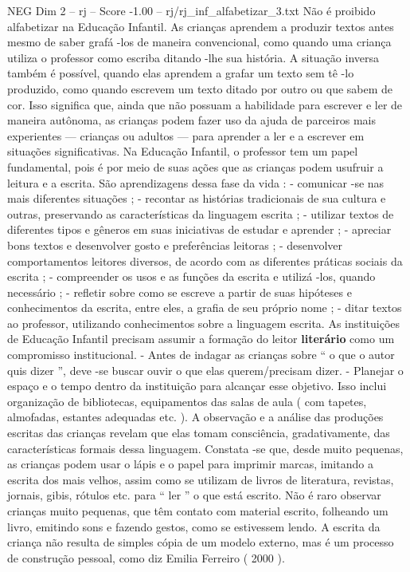 \begin{textsample}{NEG Dim 2 – rj – Score -1.00 – rj/rj\_inf\_alfabetizar\_3.txt}
Não é proibido alfabetizar na Educação Infantil.
As crianças aprendem a produzir textos antes mesmo de saber grafá -los de maneira convencional, como quando uma criança utiliza o professor como escriba ditando -lhe sua história.
A situação inversa também é possível, quando elas aprendem a grafar um texto sem tê -lo produzido, como quando escrevem um texto ditado por outro ou que sabem de cor.
Isso significa que, ainda que não possuam a habilidade para escrever e ler de maneira autônoma, as crianças podem fazer uso da ajuda de parceiros mais experientes — crianças ou adultos — para aprender a ler e a escrever em situações significativas.
Na Educação Infantil, o professor tem um papel fundamental, pois é por meio de suas ações que as crianças podem usufruir a leitura e a escrita.
São aprendizagens dessa fase da vida : - comunicar -se nas mais diferentes situações ; - recontar as histórias tradicionais de sua cultura e outras, preservando as características da linguagem escrita ; - utilizar textos de diferentes tipos e gêneros em suas iniciativas de estudar e aprender ; - apreciar bons textos e desenvolver gosto e preferências leitoras ; - desenvolver comportamentos leitores diversos, de acordo com as diferentes práticas sociais da escrita ; - compreender os usos e as funções da escrita e utilizá -los, quando necessário ; - refletir sobre como se escreve a partir de suas hipóteses e conhecimentos da escrita, entre eles, a grafia de seu próprio nome ; - ditar textos ao professor, utilizando conhecimentos sobre a linguagem escrita.
As instituições de Educação Infantil precisam assumir a formação do leitor \textbf{literário} como um compromisso institucional. - Antes de indagar as crianças sobre “ o que o autor quis dizer ”, deve -se buscar ouvir o que elas querem/precisam dizer. - Planejar o espaço e o tempo dentro da instituição para alcançar esse objetivo.
Isso inclui organização de bibliotecas, equipamentos das salas de aula ( com tapetes, almofadas, estantes adequadas etc. ).
A observação e a análise das produções escritas das crianças revelam que elas tomam consciência, gradativamente, das características formais dessa linguagem.
Constata -se que, desde muito pequenas, as crianças podem usar o lápis e o papel para imprimir marcas, imitando a escrita dos mais velhos, assim como se utilizam de livros de literatura, revistas, jornais, gibis, rótulos etc. para “ ler ” o que está escrito.
Não é raro observar crianças muito pequenas, que têm contato com material escrito, folheando um livro, emitindo sons e fazendo gestos, como se estivessem lendo.
A escrita da criança não resulta de simples cópia de um modelo externo, mas é um processo de construção pessoal, como diz Emilia Ferreiro ( 2000 ).

\end{textsample}
